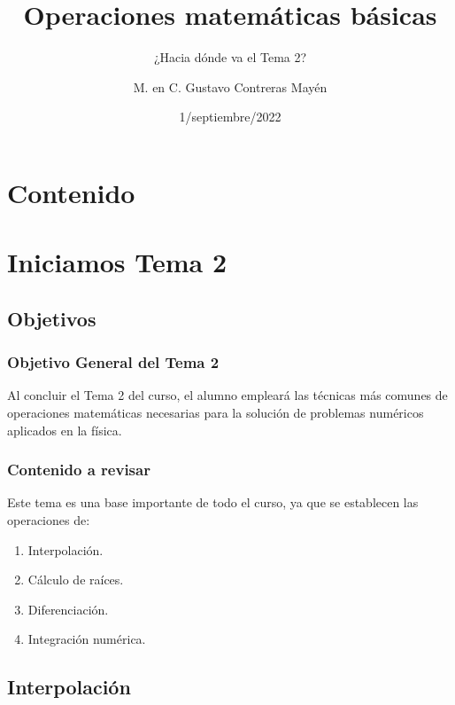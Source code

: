 \documentclass[12pt]{beamer}
\title{\large{Operaciones matemáticas básicas}}
\subtitle{¿Hacia dónde va el Tema 2?}
\author{M. en C. Gustavo Contreras Mayén}
\date{1/septiembre/2022}
\begin{document}
\maketitle

\section*{Contenido}

\section{Iniciamos Tema 2}
\subsection{Objetivos}

\begin{frame}
\frametitle{Objetivo General del Tema 2}
Al concluir el Tema 2 del curso, el alumno empleará las técnicas más comunes de operaciones matemáticas necesarias para la solución de problemas numéricos aplicados en la física.
\end{frame}
\begin{frame}
\frametitle{Contenido a revisar}
Este tema es una base importante de todo el curso, ya que se establecen las operaciones de:
\begin{enumerate}[<+->]
\item Interpolación.
\item Cálculo de raíces.
\item Diferenciación.
\item Integración numérica.
\end{enumerate}
\end{frame}

\subsection*{Interpolación}
\end{document}
